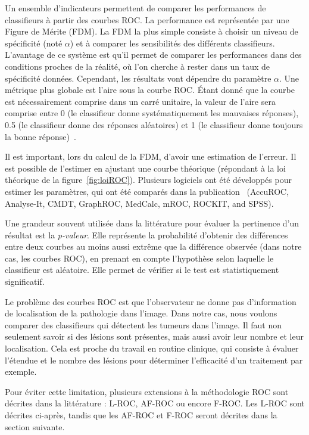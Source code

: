 Un ensemble d'indicateurs permettent de comparer les performances de classifieurs à partir des courbes ROC. La performance est représentée par une Figure de Mérite (FDM). La FDM la plus simple consiste à choisir un niveau de spécificité (noté $\alpha$) et à comparer les sensibilités des différents classifieurs. L'avantage de ce système est qu'il permet de comparer les performances dans des conditions proches de la réalité, où l'on cherche à rester dans un taux de spécificité données. Cependant, les résultats vont dépendre du paramètre $\alpha$. Une métrique plus globale est l'aire sous la courbe ROC. \'Etant donné que la courbe est nécessairement comprise dans un carré unitaire, la valeur de l'aire sera comprise entre 0 (le classifieur donne systématiquement les mauvaises réponses), 0.5 (le classifieur donne des réponses aléatoires) et 1 (le classifieur donne toujours la bonne réponse)~\cite{nie2006integrating}.

Il est important, lors du calcul de la FDM, d'avoir une estimation de l'erreur. Il est possible de l'estimer en ajustant une courbe théorique (répondant à la loi théorique de la figure~\ref{fig:loiROC}). Plusieurs logiciels ont été développés pour estimer les paramètres, qui ont été comparés dans la publication~\cite{CarstenStephan03012003} (AccuROC, Analyse-It, CMDT, GraphROC, MedCalc, mROC, ROCKIT, and SPSS).

\label{lab:p-valeur}
Une grandeur souvent utilisée dans la littérature pour évaluer la pertinence d'un résultat est la \emph{p-valeur}. Elle représente la probabilité d'obtenir des différences entre deux courbes au moins aussi extrême que la différence observée (dans notre cas, les courbes ROC), en prenant en compte l'hypothèse selon laquelle le classifieur est aléatoire. Elle permet de vérifier si le test est statistiquement significatif.

Le problème des courbes ROC est que l'observateur ne donne pas d'information de localisation de la pathologie dans l'image. Dans notre cas, nous voulons comparer des classifieurs qui détectent les tumeurs dans l'image. Il faut non seulement savoir si des lésions sont présentes, mais aussi avoir leur nombre et leur localisation. Cela est proche du travail en routine clinique, qui consiste à évaluer l'étendue et le nombre des lésions pour déterminer l'efficacité d'un traitement par exemple. 

Pour éviter cette limitation, plusieurs extensions à la méthodologie ROC sont décrites dans la littérature : L-ROC, AF-ROC ou encore F-ROC. Les L-ROC sont décrites ci-après, tandis que les AF-ROC et F-ROC seront décrites dans la section suivante.

